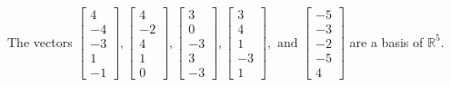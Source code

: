 \begin{exercise}
\begin{exerciseStatement}
  \end{exerciseStatement}
  \begin{exerciseAnswer}
   The vectors \(\left[\begin{array}{r}
4 \\
-4 \\
-3 \\
1 \\
-1
\end{array}\right] , \left[\begin{array}{r}
4 \\
-2 \\
4 \\
1 \\
0
\end{array}\right] , \left[\begin{array}{r}
3 \\
0 \\
-3 \\
3 \\
-3
\end{array}\right] , \left[\begin{array}{r}
3 \\
4 \\
1 \\
-3 \\
1
\end{array}\right] , \text{ and } \left[\begin{array}{r}
-5 \\
-3 \\
-2 \\
-5 \\
4
\end{array}\right]\) 
  	 are  a basis of \(\mathbb{R}^5\).
  


  \end{exerciseAnswer}
\end{exercise}